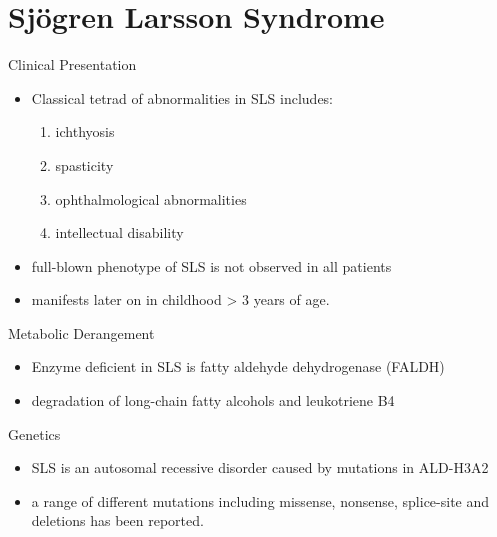 \documentclass[presentation, smaller]{beamer}
\begin{document}
\section{Sj\"{o}gren Larsson Syndrome}
\label{sec:org73c6c2f}
\begin{frame}[label={sec:org31f06ec}]{Clinical Presentation}
\begin{itemize}
\item Classical tetrad of abnormalities in SLS includes:
\begin{enumerate}
\item ichthyosis
\item spasticity
\item ophthalmological abnormalities
\item intellectual disability
\end{enumerate}
\item full-blown phenotype of SLS is not observed in all patients
\item manifests later on in childhood \textgreater{} 3 years of age.
\end{itemize}
\end{frame}

\begin{frame}[label={sec:org8a926f6}]{Metabolic Derangement}
\begin{itemize}
\item Enzyme deficient in SLS is fatty aldehyde dehydrogenase (FALDH)
\item degradation of long-chain fatty alcohols and leukotriene B4
\end{itemize}
\end{frame}

\begin{frame}[label={sec:orgc97bd4e}]{Genetics}
\begin{itemize}
\item SLS is an autosomal recessive disorder caused by mutations in
ALD-H3A2
\item a range of different mutations including missense, nonsense,
splice-site and deletions has been reported.
\end{itemize}
\end{frame}
\end{document}
